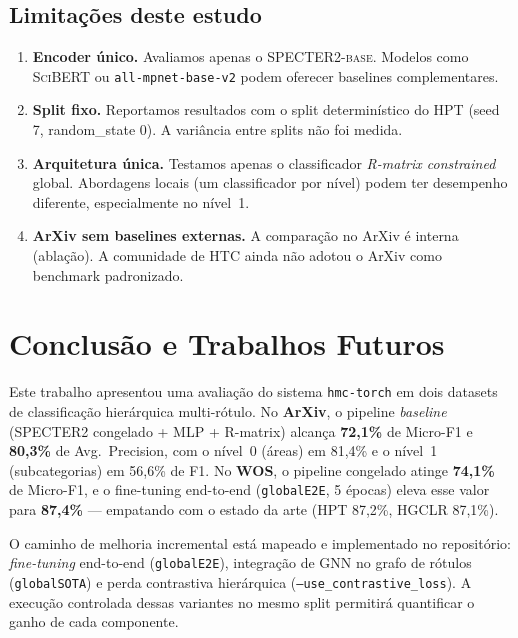 \documentclass[11pt,a4paper,twoside]{article}
\begin{document}
\subsection{Limitações deste estudo}

\begin{enumerate}[leftmargin=*, itemsep=2pt]
  \item \textbf{Encoder único.} Avaliamos apenas o \textsc{SPECTER2-base}.
        Modelos como \textsc{SciBERT} \cite{beltagy2019scibert} ou
        \texttt{all-mpnet-base-v2} podem oferecer baselines complementares.
  \item \textbf{Split fixo.} Reportamos resultados com o split determinístico
        do HPT (seed 7, random\_state 0). A variância entre splits não foi medida.
  \item \textbf{Arquitetura única.} Testamos apenas o classificador
        \textit{R-matrix constrained} global. Abordagens locais (um classificador
        por nível) podem ter desempenho diferente, especialmente no nível~1.
  \item \textbf{ArXiv sem baselines externas.} A comparação no ArXiv é interna
        (ablação). A comunidade de HTC ainda não adotou o ArXiv como benchmark
        padronizado.
\end{enumerate}

\section{Conclusão e Trabalhos Futuros}
\label{sec:conclusion}

Este trabalho apresentou uma avaliação do sistema \texttt{hmc-torch} em dois
datasets de classificação hierárquica multi-rótulo. No \textbf{ArXiv}, o pipeline
\textit{baseline} (SPECTER2 congelado + MLP + R-matrix) alcança
\textbf{72,1\%} de Micro-F1 e \textbf{80,3\%} de Avg.\ Precision, com o
nível~0 (áreas) em 81,4\% e o nível~1 (subcategorias) em 56,6\% de F1.
No \textbf{WOS}, o pipeline congelado atinge \textbf{74,1\%} de Micro-F1, e o
fine-tuning end-to-end (\texttt{globalE2E}, 5 épocas) eleva esse valor para
\textbf{87,4\%} --- empatando com o estado da arte (HPT 87,2\%, HGCLR 87,1\%).

O caminho de melhoria incremental está mapeado e implementado no repositório:
\textit{fine-tuning} end-to-end (\texttt{globalE2E}), integração de GNN no grafo
de rótulos (\texttt{globalSOTA}) e perda contrastiva hierárquica
(\texttt{--use\_contrastive\_loss}). A execução controlada dessas variantes no
mesmo split permitirá quantificar o ganho de cada componente.
\end{document}
